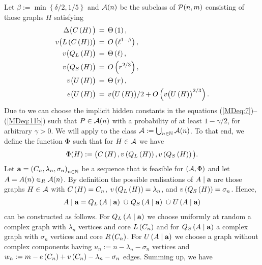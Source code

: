 Let $\beta:=\min\left\{\delta/2,1/5\right\}$ and $\mathcal{A}(n)$ be the subclass of $\mathcal{P}(n,m)$ consisting of those graphs $H$ satisfying
\begin{align}
\Delta\big(C\left(H\right)\big)&\hspace{0.06cm}=\hspace{0.06cm} \Theta\left(1\right), \label{MDeq:7}\\
v\big({L\left(C\left(H\right)\right)}\big)&\hspace{0.06cm}=\hspace{0.06cm}O\left(\ell^{1-\beta}\right),\label{MDeq:8}\\
v\big({Q_L\left(H\right)}\big)&\hspace{0.06cm}=\hspace{0.06cm}\Theta\left(\ell\right),\label{MDeq:9}\\
v\big({Q_S\left(H\right)}\big)&\hspace{0.06cm}=\hspace{0.06cm}O\left(r^{2/3}\right),\label{MDeq:10}
\\
v\big({U\left(H\right)}\big)&\hspace{0.06cm}=\hspace{0.06cm}\Theta\left(r\right),\label{MDeq:11}
\\
e\big({U\left(H\right)}\big)&\hspace{0.06cm}=\hspace{0.06cm}v\big({U\left(H\right)}\big)/2+O\left(v\big({U\left(H\right)}\big)^{2/3}\right).\label{MDeq:11b}
\end{align}
Due to  we can choose the implicit hidden constants in the equations (\ref{MDeq:7})--(\ref{MDeq:11b}) such that $P\in\mathcal{A}(n)$ with a probability of at least $1-\gamma/2$, for arbitrary $\gamma>0$. We will apply  to the class $\mathcal{A}:=\bigcup_{n\in\mathbb{N}}\mathcal{A}(n)$. To that end, we define the function $\Phi$ such that for $H\in\mathcal{A}$ we have
\begin{align*}
\Phi(H):=\big(C\left(H\right), v\left({Q_L\left(H\right)}\right), v\left({Q_S\left(H\right)}\right)\big).
\end{align*}
Let $\mathbf{a}=\left(C_n, \lambda_n, \sigma_n\right)_{n\in\mathbb{N}}$ be a sequence that is feasible for $(\mathcal{A}, \Phi)$ and let $A=A(n)\in_R \mathcal{A}(n)$. 
By definition the possible realisations of $A \mid \mathbf{a}$ are those graphs $H \in \mathcal{A}$ with $C\left(H\right)=C_n$, $v\left({Q_L\left(H\right)}\right)=\lambda_n$, and $v\left({Q_S\left(H\right)}\right)=\sigma_n$. Hence,
\begin{align*}
A \mid \mathbf{a}=Q_L\left(A \mid \mathbf{a}\right)~\dot\cup~ Q_S\left(A \mid \mathbf{a}\right)~\dot\cup~ U\left(A \mid \mathbf{a}\right)   
\end{align*}
 can be constructed as follows. For $Q_L\left(A \mid \mathbf{a}\right)$ we choose uniformly at random a complex graph with $\lambda_n$ vertices and core $L\left(C_n\right)$ and for $Q_S\left(A \mid \mathbf{a}\right)$ a complex graph with $\sigma_n$ vertices and core $R\left(C_n\right)$. For $U\left(A \mid \mathbf{a}\right)$ we choose a graph without complex components having $u_n:=n-\lambda_n-\sigma_n$ vertices and $w_n:=m-e\left({C_n}\right)+v\left({C_n}\right)-\lambda_n-\sigma_n$ edges. Summing up, we have
